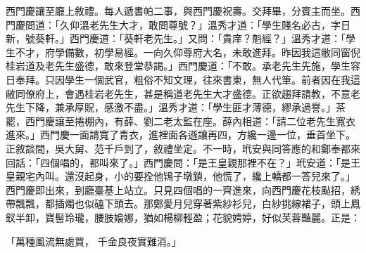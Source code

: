 西門慶讓至廳上敘禮。每人遞書帕二事，與西門慶祝壽。交拜畢，分賓主而坐。西門慶問道：「久仰溫老先生大才，敢問尊號？」溫秀才道：「學生賤名必古，字日新，號葵軒。」西門慶道：「葵軒老先生。」又問：「貴庠？魁經？」溫秀才道：「學生不才，府學備數，初學易經。一向久仰尊府大名，未敢進拜。昨因我這敝同窗倪桂岩道及老先生盛德，敢來登堂恭謁。」西門慶道：「不敢。承老先生先施，學生容日奉拜。只因學生一個武官，粗俗不知文理，往來書柬，無人代筆。前者因在我這敝同僚府上，會遇桂岩老先生，甚是稱道老先生大才盛德。正欲趨拜請教，不意老先生下降，兼承厚貺，感激不盡。」溫秀才道：「學生匪才薄德，繆承過譽。」茶罷，西門慶讓至捲棚內，有薛、劉二老太監在座。薛內相道：「請二位老先生寬衣進來。」西門慶一面請寬了青衣，進裡面各遜讓再四，方纔一邊一位，垂首坐下。正敘談間，吳大舅、范千戶到了，敘禮坐定。不一時，玳安與同答應的和鄭奉都來回話：「四個唱的，都叫來了。」西門慶問：「是王皇親那裡不在？」玳安道：「是王皇親宅內叫。還沒起身，小的要拴他鴇子墩鎖，他慌了，纔上轎都一答兒來了。」西門慶即出來，到廳臺基上站立。只見四個唱的一齊進來，向西門慶花枝颭招，綉帶飄飄，都插燭也似磕下頭去。那鄭愛月兒穿著紫紗衫兒，白紗挑線裙子，頭上鳳釵半卸，寶髻玲瓏，腰肢嬝娜，猶如楊柳輕盈；花貌娉婷，好似芙蓉豔麗。正是：

「萬種風流無處買，  千金良夜實難消。」


